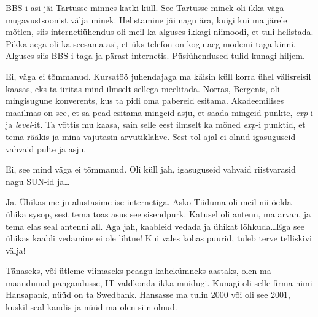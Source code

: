                  
BBS-i asi jäi Tartusse minnes katki küll. See Tartusse minek oli ikka väga 
mugavustsoonist välja minek. Helistamine jäi nagu ära, kuigi kui ma järele 
mõtlen, siis internetiühendus oli meil ka alguses ikkagi niimoodi, et tuli 
helistada. Pikka aega oli ka seesama asi, et üks telefon on kogu aeg modemi 
taga kinni. Alguses siis BBS-i taga ja pärast internetis. Püsiühendused tulid 
kunagi hiljem.
                 

Ei, väga ei tõmmanud. Kursatöö juhendajaga ma käisin küll korra ühel 
välisreisil kaasas, eks ta üritas mind ilmselt sellega meelitada. Norras, 
Bergenis, oli mingisugune konverents, kus ta pidi oma pabereid esitama. 
Akadeemilises maailmas on see, et sa pead esitama mingeid asju, et saada 
mingeid punkte, \emph{exp}-i ja \emph{level}-it. Ta võttis mu kaasa, sain selle 
eest ilmselt ka mõned \emph{exp}-i punktid, et tema rääkis ja mina vajutasin 
arvutiklahve. Sest tol ajal ei olnud igasuguseid vahvaid pulte ja asju. 


Ei, see mind väga ei tõmmanud. Oli küll jah, igasuguseid vahvaid riistvarasid 
nagu SUN-id ja\ldots 

                 
Ja. Ühikas me ju alustasime ise internetiga. Asko 
Tiiduma oli meil nii-öelda ühika sysop, sest tema 
toas asus see sisendpurk. Katusel oli antenn, ma arvan, ja tema  elas seal antenni 
all. Aga jah, kaableid vedada ja ühikat lõhkuda\ldots Ega see ühikas kaabli 
vedamine ei ole lihtne! Kui vales kohas puurid, tuleb terve telliskivi välja!


Tänaseks, või ütleme viimaseks peaagu kahekümneks aastaks, olen ma maandunud  
pangandusse,  IT-valdkonda ikka muidugi. Kunagi oli selle firma nimi Hansapank, 
nüüd on ta Swedbank. Hansasse ma tulin 2000 või oli see 2001, kuskil seal 
kandis ja nüüd ma olen siin olnud.

